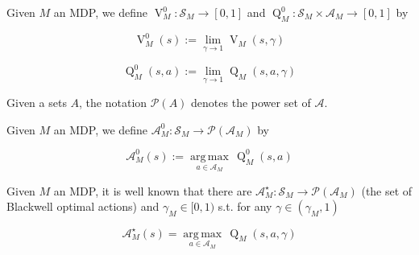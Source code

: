 \documentclass[anon,12pt]{colt2018} %
\newcommand{\Comment}[1]{}
\newcommand{\AP}[1]{\left(#1\right)}
\newcommand{\PS}[1]{\mathcal{P}\AP{#1}}
\newcommand{\Argmax}[1]{\underset{#1}{\operatorname{arg\,max}}\,}
\newcommand{\A}{\mathcal{A}}
\newcommand{\St}{\mathcal{S}}
\newcommand{\V}{\operatorname{V}}
\newcommand{\Q}{\operatorname{Q}}
\begin{document}
\begin{samepage}
\begin{definition}

Given $M$ an MDP, we define $\V^0_M : \St_M \rightarrow [0,1]$ and $\Q^0_M: \St_M \times \A_M \rightarrow [0,1]$ by

\begin{equation}
\V_M^0(s) := \lim_{\gamma \rightarrow 1} \V_M(s,\gamma)
\end{equation}

\begin{equation}
\Q_M^0(s,a) := \lim_{\gamma \rightarrow 1} \Q_M(s,a,\gamma)
\end{equation}

\Comment{Indeed, the limits above are guaranteed to exist. We can think of them as describing the \enquote{long term planning} regime.}

\end{definition}
\end{samepage}

Given a sets $A$, the notation $\PS{A}$ denotes the power set of $\A$.

\begin{samepage}
\begin{definition}

Given $M$ an MDP, we define $\A_M^0: \St_M \rightarrow \PS{\A_M}$ by

\begin{equation}
\A_M^0(s) := \Argmax{a \in \A_M} \Q_M^0(s,a)
\end{equation}

\Comment{That is, $\A_M^0(s)$ is the set of actions at state $s$ that don't enter traps (i.e. destroy value in the long run.)}

\end{definition}
\end{samepage}

\begin{samepage}
\begin{definition}

Given $M$ an MDP, it is well known that there are $\A_M^\star: \St_M \rightarrow \PS{\A_M}$ (the set of Blackwell optimal actions) and $\gamma_M\in[0,1)$ s.t. for any $\gamma\in\AP{\gamma_M,1}$

\begin{equation}
\A_M^\star(s) = \Argmax{a \in \A_M} \Q_M\AP{s,a,\gamma}
\end{equation}

\Comment{Thus, $\A_M^\star(s)$ is the set of actions that are optimal at state $s$, assuming that we plan for sufficiently long term.}

\end{definition}
\end{samepage}
\end{document}
